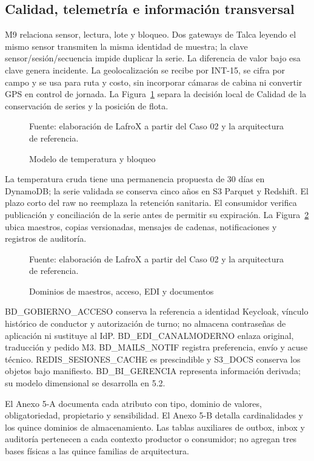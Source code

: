 \subsection{Calidad, telemetría e información transversal}
M9 relaciona sensor, lectura, lote y bloqueo. Dos gateways de Talca leyendo el mismo sensor transmiten la misma identidad de muestra; la clave sensor/sesión/secuencia impide duplicar la serie. La diferencia de valor bajo esa clave genera incidente. La geolocalización se recibe por INT-15, se cifra por campo y se usa para ruta y costo, sin incorporar cámaras de cabina ni convertir GPS en control de jornada.
La Figura~\ref{fig:5-frio} separa la decisión local de Calidad de la conservación de series y la posición de flota.

\begin{figure}[htbp]
\centering

\caption{Modelo de temperatura y bloqueo}
\label{fig:5-frio}
{\fontsize{9pt}{11pt}\selectfont Fuente: elaboración de LafroX a partir del Caso 02 y la arquitectura de referencia.}
\end{figure}\FloatBarrier

La temperatura cruda tiene una permanencia propuesta de 30 días en DynamoDB; la serie validada se conserva cinco años en S3 Parquet y Redshift. El plazo corto del raw no reemplaza la retención sanitaria. El consumidor verifica publicación y conciliación de la serie antes de permitir su expiración.
La Figura~\ref{fig:5-gobierno} ubica maestros, copias versionadas, mensajes de cadenas, notificaciones y registros de auditoría.

\begin{figure}[htbp]
\centering

\caption{Dominios de maestros, acceso, EDI y documentos}
\label{fig:5-gobierno}
{\fontsize{9pt}{11pt}\selectfont Fuente: elaboración de LafroX a partir del Caso 02 y la arquitectura de referencia.}
\end{figure}\FloatBarrier

BD\_GOBIERNO\_ACCESO conserva la referencia a identidad Keycloak, vínculo histórico de conductor y autorización de turno; no almacena contraseñas de aplicación ni sustituye al IdP. BD\_EDI\_CANALMODERNO enlaza original, traducción y pedido M3. BD\_MAILS\_NOTIF registra preferencia, envío y acuse técnico. REDIS\_SESIONES\_CACHE es prescindible y S3\_DOCS conserva los objetos bajo manifiesto. BD\_BI\_GERENCIA representa información derivada; su modelo dimensional se desarrolla en 5.2.

El Anexo 5-A documenta cada atributo con tipo, dominio de valores, obligatoriedad, propietario y sensibilidad. El Anexo 5-B detalla cardinalidades y los quince dominios de almacenamiento. Las tablas auxiliares de outbox, inbox y auditoría pertenecen a cada contexto productor o consumidor; no agregan tres bases físicas a las quince familias de arquitectura.
